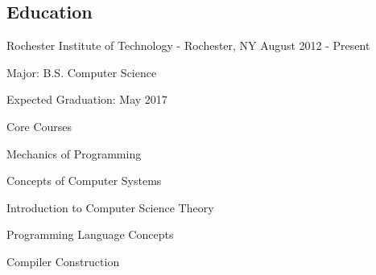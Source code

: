 \documentclass[a4paper,margin,line]{resume}
\newcommand{\rdate}[1]{\hfill {\small #1}}
\begin{document}
\begin{resume}
\section{\mysidestyle Education}
	\begin{compactdesc}
		\item[Rochester Institute of Technology] - Rochester, NY \rdate{August 2012 - Present}
		\begin{asparablank} { \small
			\item Major: B.S. Computer Science
		} \end{asparablank}
		\begin{asparablank} { \small
			\item Expected Graduation: May 2017
		} \end{asparablank}
	    \begin{asparablank} { \small
            \item Core Courses
			\begin{compactitem} { \small
                \item \hspace{1mm} Mechanics of Programming
                \item \hspace{1mm} Concepts of Computer Systems
                \item \hspace{1mm} Introduction to Computer Science Theory
                \item \hspace{1mm} Programming Language Concepts
                \item \hspace{1mm} Compiler Construction
			} \end{compactitem}
        } \end{asparablank}
	\end{compactdesc}


\end{resume}
\end{document}
